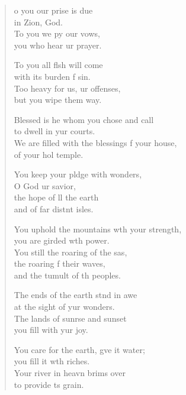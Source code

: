 \begin{verse}
  \begin{patverse}
o you our prise is due\Med\\
in Zion,  God.\\
To you we py our vows,\Med\\
you who hear ur prayer.

To you all flsh will come\Med\\
with its burden f sin.\\
Too heavy for us, ur offenses,\Med\\
but you wipe them way.

Blessed is he whom you chose and call\Med\\
to dwell in yur courts.\\
We are filled with the blessings f your house,\Med\\
of your hol temple.

You keep your pldge with wonders,\Med\\
O God ur savior,\\
the hope of ll the earth\Med\\
and of far distnt isles.

You uphold the mountains w\pointup{\i}th your strength,\Med\\
you are girded w\pointup{\i}th power.\\
You still the roaring of the sas,\Flex\\
the roaring f their waves,\Med\\
and the tumult of th peoples.

The ends of the earth stnd in awe\Med\\
at the sight of yur wonders.\\
The lands of sunr\pointup{\i}se and sunset\Med\\
you fill with yur joy.

You care for the earth, g\pointup{\i}ve it water;\Med\\
you fill it w\pointup{\i}th riches.\\
Your river in heavn brims over\Med\\
to provide \pointup{\i}ts grain.


\end{patverse}
\end{verse}
